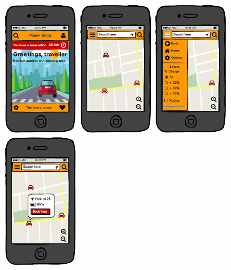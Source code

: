 \documentclass[]{article}
\begin{document}
\includegraphics[width=1.56250in]{./MobileApp/MobileApp-1.png}
\includegraphics[width=1.56250in]{./MobileApp/MobileApp-2.png}
\includegraphics[width=1.56250in]{./MobileApp/MobileApp-3.png}
\includegraphics[width=1.56250in]{./MobileApp/MobileApp-4.png}
\end{document}
